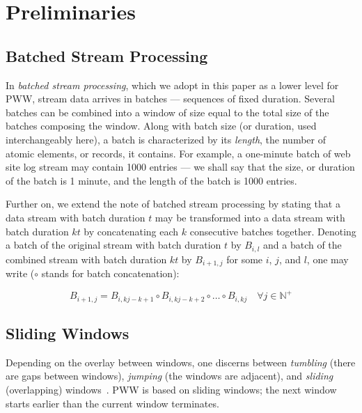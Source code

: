 \documentclass[runningheads,a4paper]{llncs}
\begin{document}
\section{Preliminaries}
\label{sec:preliminaries}

\subsection{Batched Stream Processing}

In \textit{batched stream processing}, which we adopt in this
paper as a lower level for PWW, stream data arrives in batches
--- sequences of fixed duration. Several batches can be combined
into a window of size equal to the total size of the batches
composing the window. Along with batch size (or duration, used
interchangeably here), a batch is characterized by its
\textit{length}, the number of atomic elements, or records, it
contains. For example, a one-minute batch of web site log stream
may contain 1000 entries --- we shall say that the size, or
duration of the batch is 1 minute, and the length of the batch
is 1000 entries.

Further on, we extend the note of batched stream processing by
stating that a data stream with batch duration $t$ may be
transformed into a data stream with batch duration $kt$ by
concatenating each $k$ consecutive batches together. Denoting
a batch of the original stream with batch duration $t$ by
$B_{i,l}$
and a batch of the combined stream with batch duration $kt$ by
$B_{i+1,j}$ for some $i$, $j$, and $l$, one may write ($\circ$ stands for batch
concatenation):

\begin{equation}
    B_{i+1,j} = B_{i,kj-k+1}\circ B_{i,kj-k+2}\circ \dots \circ B_{i,kj}\quad \forall j \in \mathbb{N}^+
    \label{eq:combined-batch}
\end{equation}

\subsection{Sliding Windows}

Depending on the overlay between windows, one discerns between
\textit{tumbling} (there are gaps between windows),
\textit{jumping} (the windows are adjacent), and
\textit{sliding} (overlapping) windows~\cite{GO03}. PWW is based on sliding
windows; the next window starts earlier than the current window
terminates. 
\end{document}
